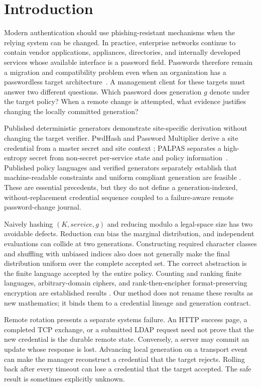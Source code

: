 \documentclass[preprint,12pt]{elsarticle}
\begin{document}
\section{Introduction}

Modern authentication should use phishing-resistant mechanisms when the
relying system can be changed. In practice, enterprise networks continue to
contain vendor applications, appliances, directories, and internally developed
services whose available interface is a password field. Passwords therefore
remain a migration and compatibility problem even when an organization has a
passwordless target architecture~\cite{herley2012persistence}. A management
client for these targets must answer two different questions. Which password
does generation $g$ denote under the target policy? When a remote change is
attempted, what evidence justifies changing the locally committed generation?

Published deterministic generators demonstrate site-specific derivation
without changing the target verifier. PwdHash and Password Multiplier derive a
site credential from a master secret and site context
\cite{ross2005pwdhash,halderman2005multiplier}; PALPAS separates a high-entropy
secret from non-secret per-service state and policy information~\cite{palpas}.
Published policy languages and verified generators separately establish that
machine-readable constraints and uniform compliant generation are feasible
\cite{gautam2022pcp,grilo2022verified}. These are essential precedents, but they
do not define a generation-indexed, without-replacement credential sequence
coupled to a failure-aware remote password-change journal.

Naively hashing $(K,\mathit{service},g)$ and reducing modulo a legal-space size
has two avoidable defects. Reduction can bias the marginal distribution, and
independent evaluations can collide at two generations. Constructing required
character classes and shuffling with unbiased indices also does not generally
make the final distribution uniform over the complete accepted set. The
correct abstraction is the finite language accepted by the entire policy.
Counting and ranking finite languages, arbitrary-domain ciphers, and
rank-then-encipher format-preserving encryption are established results
\cite{goldberg1985ranking,black2002finite,bellare2009fpe,oudinet2013uniform}.
Our method does not rename these results as new mathematics; it binds them to a
credential lineage and generation contract.

Remote rotation presents a separate systems failure. An HTTP success page, a
completed TCP exchange, or a submitted LDAP request need not prove that the
new credential is the durable remote state. Conversely, a server may commit an
update whose response is lost. Advancing local generation on a transport event
can make the manager reconstruct a credential that the target rejects. Rolling
back after every timeout can lose a credential that the target accepted. The
safe result is sometimes explicitly unknown.
\end{document}
